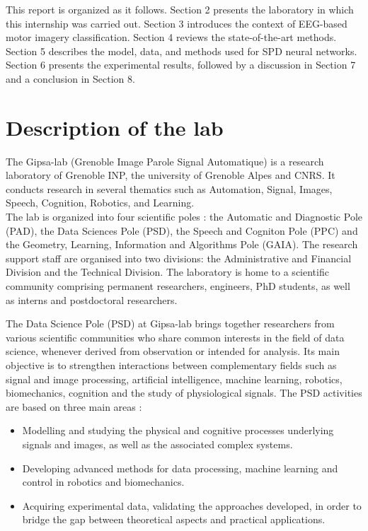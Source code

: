 \documentclass[11pt,a4paper]{article}
\begin{document}
This report is organized as it follows. Section 2 presents the laboratory in which this internship was carried out. Section 3 introduces the context of EEG-based motor imagery classification. Section 4 reviews the state-of-the-art methods. Section 5 describes the model, data, and methods used for SPD neural networks. Section 6 presents the experimental results, followed by a discussion in Section 7 and a conclusion in Section 8.


\newpage

\section{Description of the lab}
The Gipsa-lab \cite{gipsa_main} (Grenoble Image Parole Signal Automatique) is a research laboratory of Grenoble INP, the university of Grenoble Alpes and  CNRS. It conducts research in several thematics such as Automation, Signal, Images, Speech, Cognition, Robotics, and Learning. \\
The lab is organized into four scientific poles : the Automatic and Diagnostic Pole (PAD), the Data Sciences Pole (PSD), the Speech and Cogniton Pole (PPC) and the Geometry, Learning, Information and Algorithms Pole (GAIA). 
The research support staff are organised into two divisions: the Administrative and Financial Division and the Technical Division.
The laboratory is home to a scientific community comprising permanent researchers, engineers, PhD students, as well as interns and postdoctoral researchers. \newline

The Data Science Pole (PSD) at Gipsa-lab brings together researchers from various scientific communities who share common interests in the field of data science, whenever derived from observation or intended for analysis. Its main objective is to strengthen interactions  between complementary fields such as signal and image processing, artificial intelligence, machine learning, robotics, biomechanics, cognition and the study of physiological signals. The PSD activities are based on three main areas : 

\begin{itemize}
    \item Modelling and studying the physical and cognitive processes underlying signals and images, as well as the associated complex systems.
    \item Developing advanced methods for data processing, machine learning and control in robotics and biomechanics.
    \item Acquiring experimental data, validating the approaches developed, in order to bridge the gap between theoretical aspects and practical applications.
\end{itemize}
\end{document}

